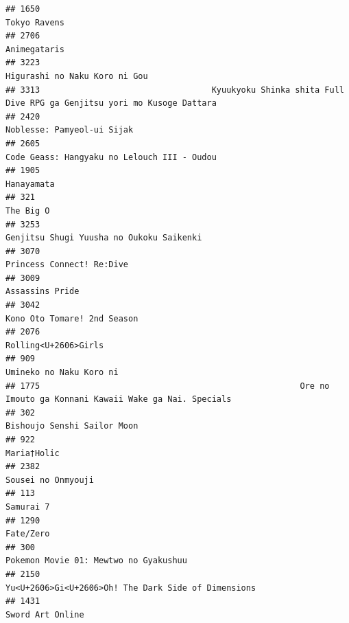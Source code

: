 \documentclass[
]{article}
\begin{document}
\begin{verbatim}
## 1650                                                                                              Tokyo Ravens
## 2706                                                                                              Animegataris
## 3223                                                                             Higurashi no Naku Koro ni Gou
## 3313                                   Kyuukyoku Shinka shita Full Dive RPG ga Genjitsu yori mo Kusoge Dattara
## 2420                                                                                Noblesse: Pamyeol-ui Sijak
## 2605                                                               Code Geass: Hangyaku no Lelouch III - Oudou
## 1905                                                                                                Hanayamata
## 321                                                                                                  The Big O
## 3253                                                                  Genjitsu Shugi Yuusha no Oukoku Saikenki
## 3070                                                                                 Princess Connect! Re:Dive
## 3009                                                                                           Assassins Pride
## 3042                                                                               Kono Oto Tomare! 2nd Season
## 2076                                                                                      Rolling<U+2606>Girls
## 909                                                                                    Umineko no Naku Koro ni
## 1775                                                     Ore no Imouto ga Konnani Kawaii Wake ga Nai. Specials
## 302                                                                                Bishoujo Senshi Sailor Moon
## 922                                                                                                Maria†Holic
## 2382                                                                                        Sousei no Onmyouji
## 113                                                                                                  Samurai 7
## 1290                                                                                                 Fate/Zero
## 300                                                                      Pokemon Movie 01: Mewtwo no Gyakushuu
## 2150                                                       Yu<U+2606>Gi<U+2606>Oh! The Dark Side of Dimensions
## 1431                                                                                          Sword Art Online

\end{verbatim}
\end{document}
